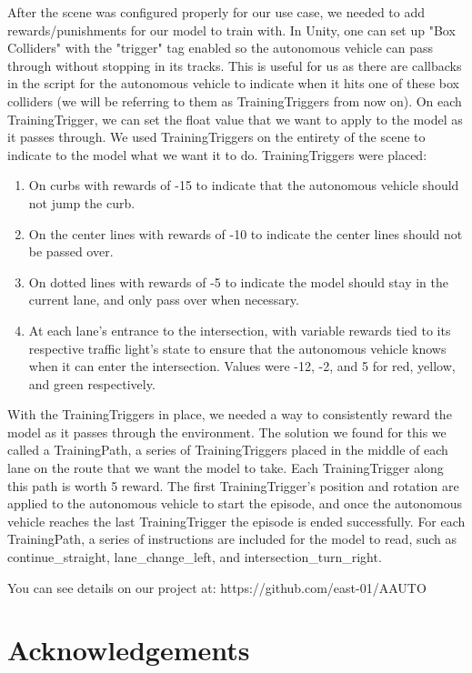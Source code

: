 \documentclass[conference]{IEEEtran}
\begin{document}
After the scene was configured properly for our use case, we needed to add rewards/punishments for our model to train with. In Unity, one can set up "Box Colliders" with the "trigger" tag enabled so the autonomous vehicle can pass through without stopping in its tracks. This is useful for us as there are callbacks in the script for the autonomous vehicle to indicate when it hits one of these box colliders (we will be referring to them as TrainingTriggers from now on). On each TrainingTrigger, we can set the float value that we want to apply to the model as it passes through. We used TrainingTriggers on the entirety of the scene to indicate to the model what we want it to do. TrainingTriggers were placed:
\begin{enumerate}
    \item On curbs with rewards of -15 to indicate that the autonomous vehicle should not jump the curb.
    \item On the center lines with rewards of -10 to indicate the center lines should not be passed over.
    \item On dotted lines with rewards of -5 to indicate the model should stay in the current lane, and only pass over when necessary.
    \item At each lane's entrance to the intersection, with variable rewards tied to its respective traffic light's state to ensure that the autonomous vehicle knows when it can enter the intersection. Values were -12, -2, and 5 for red, yellow, and green respectively.
\end{enumerate}\par
With the TrainingTriggers in place, we needed a way to consistently reward the model as it passes through the environment. The solution we found for this we called a TrainingPath, a series of TrainingTriggers placed in the middle of each lane on the route that we want the model to take. Each TrainingTrigger along this path is worth 5 reward. The first TrainingTrigger's position and rotation are applied to the autonomous vehicle to start the episode, and once the autonomous vehicle reaches the last TrainingTrigger the episode is ended successfully. For each TrainingPath, a series of instructions are included for the model to read, such as continue\_straight, lane\_change\_left, and intersection\_turn\_right.

\par
You can see details on our project at: https://github.com/east-01/AAUTO

\section{Acknowledgements}
\end{document}

